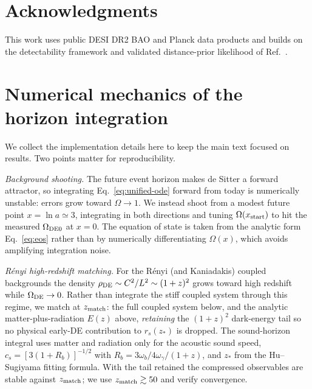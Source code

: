 \documentclass[twocolumn,10pt]{article}
\begin{document}
\section*{Acknowledgments}
This work uses public DESI DR2 BAO and Planck data products and builds on the
detectability framework and validated distance-prior likelihood of
Ref.~\cite{StepPaper}.

\appendix
\section{Numerical mechanics of the horizon integration}
\label{app:numerics}

We collect the implementation details here to keep the main text focused on
results. Two points matter for reproducibility.

\emph{Background shooting.} The future event horizon makes de Sitter a forward
attractor, so integrating Eq.~\eqref{eq:unified-ode} forward from today is
numerically unstable: errors grow toward $\Omega\to1$. We instead shoot from a
modest future point $x=\ln a\simeq3$, integrating in both directions and tuning
$\Omega(x_{\rm start})$ to hit the measured $\Omega_{\rm DE0}$ at $x=0$. The
equation of state is taken from the analytic form Eq.~\eqref{eq:eos} rather than
by numerically differentiating $\Omega(x)$, which avoids amplifying integration
noise.

\emph{R\'enyi high-redshift matching.} For the R\'enyi (and Kaniadakis) coupled
backgrounds the density $\rho_{\rm DE}\sim C^2/L^2\sim(1+z)^2$ grows toward high
redshift while $\Omega_{\rm DE}\to0$. Rather than integrate the stiff coupled
system through this regime, we match at $z_{\rm match}$: the full coupled system
below, and the analytic matter-plus-radiation $E(z)$ above, \emph{retaining} the
$(1+z)^2$ dark-energy tail so no physical early-DE contribution to $r_s(z_*)$ is
dropped. The sound-horizon integral uses matter and radiation only for the
acoustic sound speed, $c_s=[3(1+R_b)]^{-1/2}$ with
$R_b=3\omega_b/4\omega_\gamma/(1+z)$, and $z_*$ from the Hu--Sugiyama fitting
formula. With the tail retained the compressed observables are stable against
$z_{\rm match}$; we use $z_{\rm match}\gtrsim50$ and verify convergence.
\end{document}
